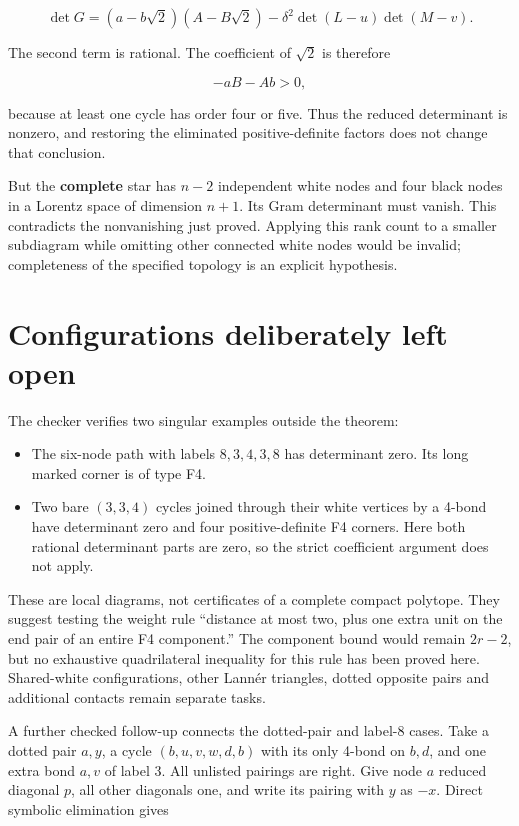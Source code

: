 \documentclass[
  10pt,
]{report}
\providecommand{\tightlist}{%
  \setlength{\itemsep}{0pt}\setlength{\parskip}{0pt}}
\begin{document}
\[
\det G=(a-b\sqrt2)(A-B\sqrt2)
-\delta^2\det(L-u)\det(M-v).
\]

The second term is rational. The coefficient of \(\sqrt2\) is therefore

\[
-aB-Ab>0,
\]

because at least one cycle has order four or five. Thus the reduced
determinant is nonzero, and restoring the eliminated positive-definite
factors does not change that conclusion.

But the \textbf{complete} star has \(n-2\) independent white nodes and
four black nodes in a Lorentz space of dimension \(n+1\). Its Gram
determinant must vanish. This contradicts the nonvanishing just proved.
Applying this rank count to a smaller subdiagram while omitting other
connected white nodes would be invalid; completeness of the specified
topology is an explicit hypothesis.

\section{Configurations deliberately left
open}\label{configurations-deliberately-left-open}

The checker verifies two singular examples outside the theorem:

\begin{itemize}
\tightlist
\item
  The six-node path with labels \(8,3,4,3,8\) has determinant zero. Its
  long marked corner is of type F4.
\item
  Two bare \((3,3,4)\) cycles joined through their white vertices by a
  4-bond have determinant zero and four positive-definite F4 corners.
  Here both rational determinant parts are zero, so the strict
  coefficient argument does not apply.
\end{itemize}

These are local diagrams, not certificates of a complete compact
polytope. They suggest testing the weight rule ``distance at most two,
plus one extra unit on the end pair of an entire F4 component.'' The
component bound would remain \(2r-2\), but no exhaustive quadrilateral
inequality for this rule has been proved here. Shared-white
configurations, other Lannér triangles, dotted opposite pairs and
additional contacts remain separate tasks.

A further checked follow-up connects the dotted-pair and label-8 cases.
Take a dotted pair \(a,y\), a cycle \((b,u,v,w,d,b)\) with its only
4-bond on \(b,d\), and one extra bond \(a,v\) of label 3. All unlisted
pairings are right. Give node \(a\) reduced diagonal \(p\), all other
diagonals one, and write its pairing with \(y\) as \(-x\). Direct
symbolic elimination gives
\end{document}
